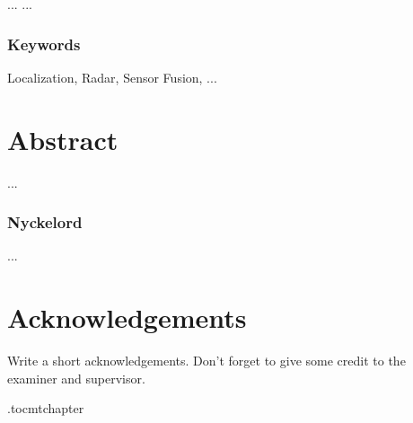 ...
\vspace{2cm}
...





\subsection*{Keywords}
Localization, Radar, Sensor Fusion,  ...





\newpage
\thispagestyle{plain}
\chapter*{Abstract}
...

\subsection*{Nyckelord}
...


\newpage
\thispagestyle{plain}
\chapter*{Acknowledgements}
Write a short acknowledgements. Don't forget to give some credit to the examiner and supervisor.

\newpage



\newpage

\etocdepthtag.toc{mtchapter}
\thispagestyle{plain}
\tableofcontents

\newpage


